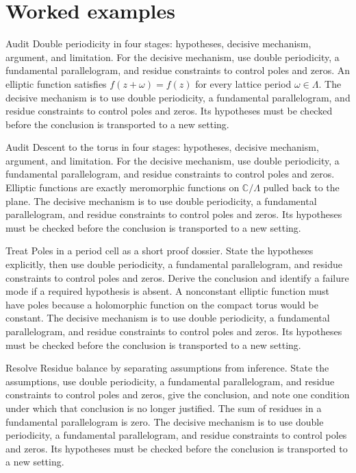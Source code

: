 \section{Worked examples}

\begin{example}\label{ex:iv28-worked-01}
Audit Double periodicity in four stages: hypotheses, decisive mechanism, argument, and limitation. For the decisive mechanism, use double periodicity, a fundamental parallelogram, and residue constraints to control poles and zeros. An elliptic function satisfies $f(z+\omega)=f(z)$ for every lattice period $\omega\in\Lambda$. The decisive mechanism is to use double periodicity, a fundamental parallelogram, and residue constraints to control poles and zeros. Its hypotheses must be checked before the conclusion is transported to a new setting.
\end{example}

\begin{example}\label{ex:iv28-worked-02}
Audit Descent to the torus in four stages: hypotheses, decisive mechanism, argument, and limitation. For the decisive mechanism, use double periodicity, a fundamental parallelogram, and residue constraints to control poles and zeros. Elliptic functions are exactly meromorphic functions on $\mathbb C/\Lambda$ pulled back to the plane. The decisive mechanism is to use double periodicity, a fundamental parallelogram, and residue constraints to control poles and zeros. Its hypotheses must be checked before the conclusion is transported to a new setting.
\end{example}

\begin{example}\label{ex:iv28-worked-03}
Treat Poles in a period cell as a short proof dossier. State the hypotheses explicitly, then use double periodicity, a fundamental parallelogram, and residue constraints to control poles and zeros. Derive the conclusion and identify a failure mode if a required hypothesis is absent. A nonconstant elliptic function must have poles because a holomorphic function on the compact torus would be constant. The decisive mechanism is to use double periodicity, a fundamental parallelogram, and residue constraints to control poles and zeros. Its hypotheses must be checked before the conclusion is transported to a new setting.
\end{example}

\begin{example}\label{ex:iv28-worked-04}
Resolve Residue balance by separating assumptions from inference. State the assumptions, use double periodicity, a fundamental parallelogram, and residue constraints to control poles and zeros, give the conclusion, and note one condition under which that conclusion is no longer justified. The sum of residues in a fundamental parallelogram is zero. The decisive mechanism is to use double periodicity, a fundamental parallelogram, and residue constraints to control poles and zeros. Its hypotheses must be checked before the conclusion is transported to a new setting.
\end{example}

